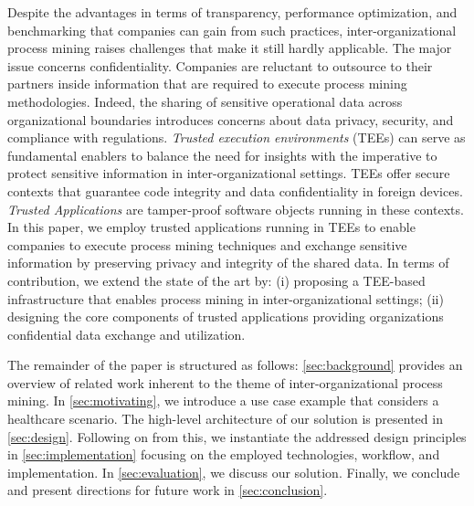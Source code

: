 Despite the advantages in terms of transparency, performance optimization, and benchmarking that companies can gain from such practices, inter-organizational process mining raises challenges that make it still hardly applicable. The major issue concerns confidentiality. Companies are reluctant to outsource to their partners inside information that are required to execute process mining methodologies. Indeed, the sharing of sensitive operational data across organizational boundaries introduces concerns about data privacy, security, and compliance with regulations. \textit{Trusted execution environments} (TEEs) can serve as fundamental enablers to balance the need for insights with the imperative to protect sensitive information in inter-organizational settings. TEEs offer secure contexts that guarantee code integrity and data confidentiality in foreign devices. \textit{Trusted Applications} are tamper-proof software objects running in these contexts. In this paper, we employ trusted applications running in TEEs to enable companies to execute process mining techniques and exchange sensitive information by preserving privacy and integrity of the shared data. In terms of contribution, we extend the state of the art by: (i) proposing a TEE-based infrastructure that enables process mining in inter-organizational settings; (ii) designing the core components of trusted applications providing organizations confidential data exchange and utilization.

The remainder of the paper is structured as follows: \cref{sec:background} provides an overview of related work inherent to the theme of inter-organizational process mining. In \cref{sec:motivating}, we introduce a use case example that considers a healthcare scenario. The high-level architecture of our solution is presented in \cref{sec:design}. Following on from this, we instantiate the addressed design principles in \cref{sec:implementation} focusing on the employed technologies, workflow, and implementation. In \cref{sec:evaluation}, we discuss our solution. Finally, we conclude and present directions for future work in \cref{sec:conclusion}.
